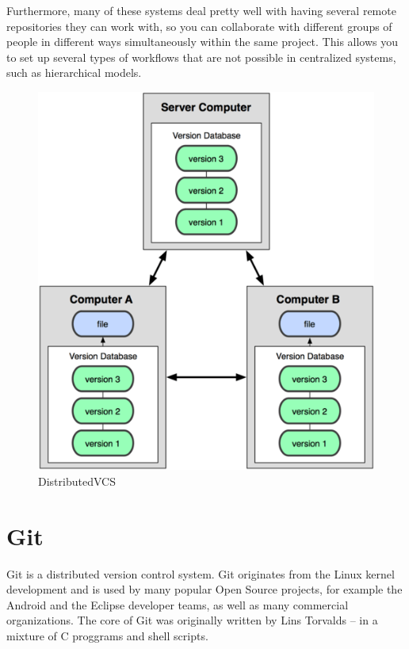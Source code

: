\documentclass[11pt,a4paper]{article}
\begin{document}
Furthermore, many of these systems deal pretty well with having several remote repositories they can work with, so you can collaborate with different groups of people in different ways simultaneously within the same project. This allows you to set up several types of workflows that are not possible in centralized systems, such as hierarchical models.
\begin{figure}[H]
\begin{center}
\includegraphics[scale=0.4]{DistributedVCS.png}
\caption{DistributedVCS}
\label{DistributedVCS}\end{center}
\end{figure}

\section*{Git}
Git is a distributed version control system. Git originates from the Linux kernel development and is used by many popular Open Source projects, for example the Android and the Eclipse developer teams, as well as many commercial organizations. The core of Git was originally written by Lins Torvalds -- in a mixture of C proggrams and shell scripts.
\end{document}
